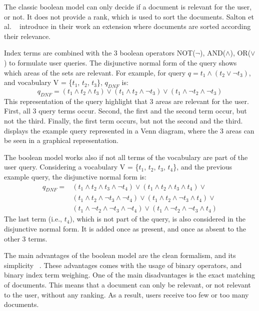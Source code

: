 The classic boolean model can only decide if a document is relevant for the user, or not. It does not provide a rank, which is used to sort the documents. Salton et al. ~\cite{Salton-Extended-1983} introduce in their work an extension where documents are sorted according their relevance.

Index terms are combined with the $3$ boolean operators NOT($\neg$), AND($\wedge$), OR($\vee$) to formulate user queries. The disjunctive normal form of the query shows which areas of the sets are relevant. For example, for query $q=t_1 \wedge (t_2 \vee \neg t_3)$, and vocabulary V = \{$t_1$, $t_2$, $t_3$\}, $q_{DNF}$ is:
\begin{equation}
q_{DNF} = (t_1 \wedge t_2 \wedge t_3) \vee (t_1 \wedge t_2 \wedge \neg t_3) \vee (t_1 \wedge \neg t_2 \wedge \neg t_3)
\end{equation}
This representation of the query highlight that $3$ areas are relevant for the user. First, all $3$ query terms occur. Second, the first and the second term occur, but not the third. Finally, the first term occurs, but not the second and the third.  displays the example query represented in a Venn diagram, where the $3$ areas can be seen in a graphical representation.

The boolean model works also if not all terms of the vocabulary are part of the user query. Considering a vocabulary V = \{$t_1$, $t_2$, $t_3$, $t_4$\}, and the previous example query, the disjunctive normal form is:
\begin{equation}
  \begin{aligned}
    q_{DNF} = &(t_1 \wedge t_2 \wedge t_3 \wedge \neg t_4) \vee (t_1 \wedge t_2 \wedge t_3 \wedge t_4) \vee \\
              &(t_1 \wedge t_2 \wedge \neg t_3 \wedge \neg t_4) \vee (t_1 \wedge t_2 \wedge \neg t_3 \wedge t_4) \vee \\
              &(t_1 \wedge \neg t_2 \wedge \neg t_3 \wedge \neg t_4) \vee (t_1 \wedge \neg t_2 \wedge \neg t_3 \wedge t_4)
  \end{aligned}
\end{equation}
The last term (i.e., $t_4$), which is not part of the query, is also considered in the disjunctive normal form. It is added once as present, and once as absent to the other $3$ terms.

The main advantages of the boolean model are the clean formalism, and its simplicity ~\cite{ModernInvormationRetrieval1999}. These advantages comes with the usage of binary operators, and binary index term weighing. One of the main disadvantages is the exact matching of documents. This means that a document can only be relevant, or not relevant to the user, without any ranking. As a result, users receive too few or too many documents.

